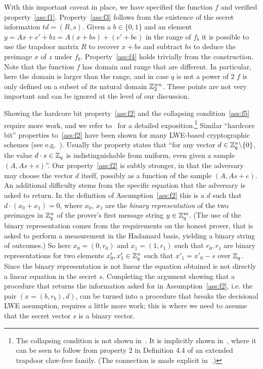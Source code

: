 With this important caveat in place, we have specified the function $f$ and verified property~\ref{ass:f1}. Property~\ref{ass:f3} follows from the existence of the secret information $td=(R,s)$. Given a $b\in\{0,1\}$ and an element $y=Ax+e'+bz = A(x+bs)+(e'+be)$ in the range of $f_b$  it is possible to use the trapdoor matrix $R$ to recover $x+bs$ and subtract $bs$ to deduce the preimage $x$ of $z$ under $f_b$. Property~\ref{ass:f4} holds trivially from the construction. Note that the function $f$ has domain and range that are different. In particular, here the domain is larger than the range, and in case $q$ is not a power of $2$ $f$ is only defined on a subset of its natural domain $\mathbb{Z}_2^{wn}$. These points are not very important and can be ignored at the level of our discussion. 

Showing the hardcore bit property~\ref{ass:f2} and the collapsing condition~\ref{ass:f5} require more work, and we refer to~\cite{brakerski2018cryptographic} for a detailed exposition.\footnote{The collapsing condition is not shown in~\cite{brakerski2018cryptographic}. It is implicitly shown in~\cite{mahadev2018classical}, where it can be seen to follow from property 2 in Definition 4.4 of an extended trapdoor claw-free family. (The connection is made explicit in~\cite{gheorghiu2019computationally}.)}
 Similar ``hardcore bit'' properties to~\ref{ass:f2} have been shown for many LWE-based cryptographic schemes (see e.g.~\cite{akavia2009simultaneous}). Usually the property states that ``for any vector $d\in\mathbb{Z}_q^n\backslash\{0\}$, the value $d\cdot s\in\mathbb{Z}_q$ is indistinguishable from uniform, even given a sample $(A,As+e)$''. Our property~\ref{ass:f2} is subtly stronger, in that the adversary may choose the vector $d$ itself, possibly as a function of the sample $(A,As+e)$. An additional difficulty stems from the specific equation that the adversary is asked to return. In the definition of Assumption~\ref{ass:f2} this is a $d$ such that $d\cdot (x_0+x_1)=0$, where $x_0$, $x_1$ are the \emph{binary representation} of the two preimages in $\mathbb{Z}_q^n$ of the prover's first message string $y\in \mathbb{Z}_q^m$. (The use of the binary representation comes from the requirements on the honest prover, that is asked to perform a measurement in the Hadamard basis, yielding a binary string of outcomes.) So here $x_0=(0,r_0)$ and $x_1=(1,r_1)$ such that $r_0,r_1$ are binary representations for two elements $x'_0,x'_1\in \mathbb{Z}_q^n$ such that $x'_1=x'_0-s$ over $\mathbb{Z}_q$. Since the binary representation is not linear the equation obtained is not directly a linear equation in the secret $s$. Completing  the argument showing that a procedure that returns the information asked for in Assumption~\ref{ass:f2}, i.e. the pair $(x=(b,r_b),d)$, can be turned into a procedure that breaks the decisional LWE assumption, requires a little more work; this is where we need to assume that the secret vector $s$ is a binary vector. 
